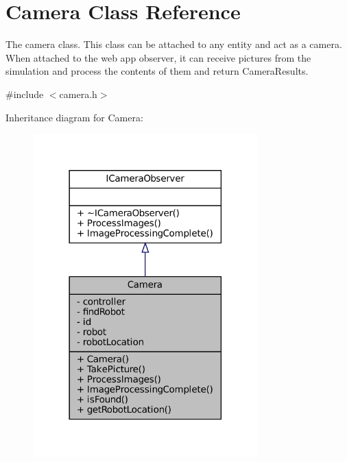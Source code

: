 \hypertarget{classCamera}{}\section{Camera Class Reference}
\label{classCamera}


The camera class. This class can be attached to any entity and act as a camera. When attached to the web app observer, it can receive pictures from the simulation and process the contents of them and return Camera\+Results.  




{\ttfamily \#include $<$camera.\+h$>$}



Inheritance diagram for Camera\+:\nopagebreak
\begin{figure}[H]
\begin{center}
\leavevmode
\includegraphics[width=246pt]{classCamera__inherit__graph}
\end{center}
\end{figure}


